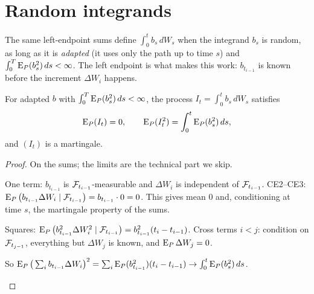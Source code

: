 \begin{pic}
\end{pic}

\section{Random integrands}

The same left-endpoint sums define $\int_0^tb_s\,dW_s$ when the integrand $b_s$ is random, as long as it is \emph{adapted} (it uses only the path up to time $s$) and $\int_0^T\operatorname{E}_P(b_s^2)\,ds<\infty$. The left endpoint is what makes this work: $b_{t_{i-1}}$ is known before the increment $\Delta W_i$ happens.

\begin{theorem}
\label{thm:ito-mg}
For adapted $b$ with $\int_0^T\operatorname{E}_P(b_s^2)\,ds<\infty$, the process $I_t=\int_0^tb_s\,dW_s$ satisfies
\[
  \operatorname{E}_P(I_t)=0,\qquad \operatorname{E}_P(I_t^2)=\int_0^t\operatorname{E}_P(b_s^2)\,ds,
\]
and $(I_t)$ is a martingale.
\end{theorem}
\begin{proof}
On the sums; the limits are the technical part we skip.
\begin{steps}
  \item One term: $b_{t_{i-1}}$ is $\mathcal F_{t_{i-1}}$-measurable and $\Delta W_i$ is independent of $\mathcal F_{t_{i-1}}$. CE2--CE3: $\operatorname{E}_P\big(b_{t_{i-1}}\Delta W_i\mid\mathcal F_{t_{i-1}}\big)=b_{t_{i-1}}\cdot0=0$. This gives mean $0$ and, conditioning at time $s$, the martingale property of the sums.
  \item Squares: $\operatorname{E}_P\big(b_{t_{i-1}}^2\Delta W_i^2\mid\mathcal F_{t_{i-1}}\big)=b_{t_{i-1}}^2(t_i-t_{i-1})$. Cross terms $i<j$: condition on $\mathcal F_{t_{j-1}}$, everything but $\Delta W_j$ is known, and $\operatorname{E}_P\Delta W_j=0$.
  \item So $\operatorname{E}_P\big(\sum_ib_{t_{i-1}}\Delta W_i\big)^2=\sum_i\operatorname{E}_P(b_{t_{i-1}}^2)(t_i-t_{i-1})\to\int_0^t\operatorname{E}_P(b_s^2)\,ds$. \qedhere
\end{steps}
\end{proof}

